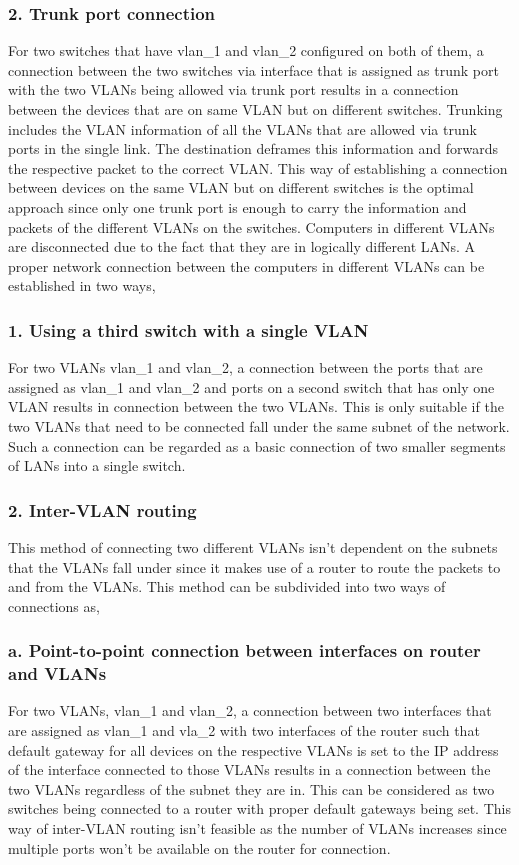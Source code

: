 \documentclass{lab_sheet}
\begin{document}
\subsubsection*{2. Trunk port connection}
For two switches that have vlan\_1 and vlan\_2 configured on both of them, a connection between the two switches via interface that is assigned as trunk port with the two VLANs being allowed via trunk port results in a connection between the devices that are on same VLAN but on different switches. Trunking includes the VLAN information of all the VLANs that are allowed via trunk ports in the single link. The destination deframes this information and forwards the respective packet to the correct VLAN. This way of establishing a connection between devices on the same VLAN but on different switches is the optimal approach since only one trunk port is enough to carry the information and packets of the different VLANs on the switches.
Computers in different VLANs are disconnected due to the fact that they are in logically different LANs. A proper network connection between the computers in different VLANs can be established in two ways,
\subsubsection*{1. Using a third switch with a single VLAN}
For two VLANs vlan\_1 and vlan\_2, a connection between the ports that are assigned as vlan\_1 and vlan\_2 and ports on a second switch that has only one VLAN results in connection between the two VLANs. This is only suitable if the two VLANs that need to be connected fall under the same subnet of the network. Such a connection can be regarded as a basic connection of two smaller segments of LANs into a single switch.
\subsubsection*{2. Inter-VLAN routing}
This method of connecting two different VLANs isn't dependent on the subnets that the VLANs fall under since it makes use of a router to route the packets to and from the VLANs. This method can be subdivided into two ways of connections as,
\subsubsection*{a. Point-to-point connection between interfaces on router and VLANs}
For two VLANs, vlan\_1 and vlan\_2, a connection between two interfaces that are assigned as vlan\_1 and vla\_2 with two interfaces of the router such that default gateway for all devices on the respective VLANs is set to the IP address of the interface connected to those VLANs results in a connection between the two VLANs regardless of the subnet they are in. This can be considered as two switches being connected to a router with proper default gateways being set. This way of inter-VLAN routing isn't feasible as the number of VLANs increases since multiple ports won't be available on the router for connection. 
\end{document}

